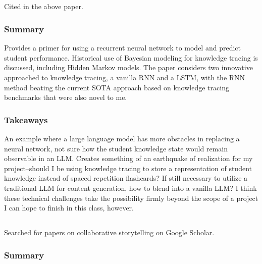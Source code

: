 \documentclass[
	letterpaper, %
]{jdf}
\begin{document}
\subsection{}
Cited in the above paper.

\subsubsection{Summary}
Provides a primer for using a recurrent neural network to model and predict student performance. Historical use of Bayesian modeling for knowledge tracing is discussed, including Hidden Markov models. The paper considers two innovative approached to knowledge tracing, a vanilla RNN and a LSTM, with the RNN method beating the current SOTA approach based on knowledge tracing benchmarks that were also novel to me.

\subsubsection{Takeaways}
An example where a large language model has more obstacles in replacing a neural network, not sure how the student knowledge state would remain observable in an LLM. Creates something of an earthquake of realization for my project–should I be using knowledge tracing to store a representation of student knowledge instead of spaced repetition flashcards? If still necessary to utilize a traditional LLM for content generation, how to blend into a vanilla LLM? I think these technical challenges take the possibility firmly beyond the scope of a project I can hope to finish in this class, however.

\subsection{}
Searched for papers on collaborative storytelling on Google Scholar.

\subsubsection{Summary}
\end{document}
